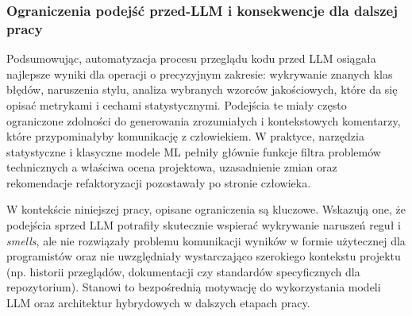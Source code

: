 \subsubsection{Ograniczenia podejść przed-LLM i konsekwencje dla dalszej pracy}
Podsumowując, automatyzacja procesu przeglądu kodu przed LLM osiągała najlepsze wyniki dla operacji o precyzyjnym zakresie:
wykrywanie znanych klas błędów, naruszenia stylu, analiza wybranych wzorców jakościowych, które da się opisać metrykami i
cechami statystycznymi. Podejścia te miały często ograniczone zdolności do generowania zrozumiałych i kontekstowych
komentarzy, które przypominałyby komunikację z człowiekiem. W praktyce, narzędzia statystyczne i klasyczne modele ML
pełniły głównie funkcje filtra problemów technicznych a właściwa ocena projektowa, uzasadnienie zmian oraz rekomendacje
refaktoryzacji pozostawały po stronie człowieka.

W kontekście niniejszej pracy, opisane ograniczenia są kluczowe. Wskazują one, że podejścia sprzed LLM potrafiły skutecznie
wspierać wykrywanie naruszeń reguł i \textit{smells}, ale nie rozwiązały problemu komunikacji wyników w formie użytecznej
dla programistów oraz nie uwzględniały wystarczająco szerokiego kontekstu projektu (np. historii przeglądów,
dokumentacji czy standardów specyficznych dla repozytorium). Stanowi to bezpośrednią motywację do wykorzystania modeli
LLM oraz architektur hybrydowych w dalszych etapach pracy.